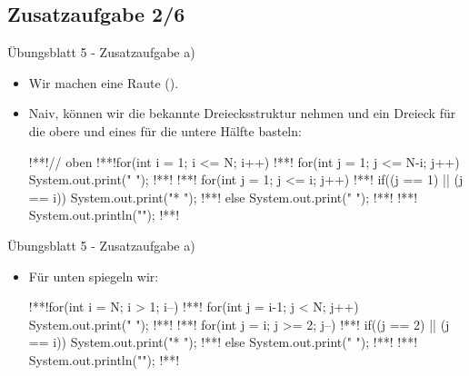 \subsection{Zusatzaufgabe 2/6}
\begin{frame}[fragile]{Übungsblatt 5 - Zusatzaufgabe a)}
    \begin{itemize}[<+(1)->]
        \item Wir machen eine Raute ().
        \item Naiv, können wir die bekannte Dreiecksstruktur nehmen und ein Dreieck für die obere und eines für die untere Hälfte basteln:
\begin{plainjava}
!**!// oben
!**!for(int i = 1; i <= N; i++) {
!**!    for(int j = 1; j <= N-i; j++) System.out.print(" ");
!**!
!**!    for(int j = 1; j <= i; j++) {
!**!        if((j == 1) || (j == i)) System.out.print("* ");
!**!        else System.out.print("  ");
!**!    }
!**!    System.out.println("");
!**!}
\end{plainjava}
    \end{itemize}
\end{frame}

\begin{frame}[fragile]{Übungsblatt 5 - Zusatzaufgabe a)}
    \begin{itemize}[<+(1)->]
        \item Für unten spiegeln wir:
\begin{plainjava}
!**!for(int i = N; i > 1; i--) {
!**!    for(int j = i-1; j < N; j++) System.out.print(" ");
!**!
!**!    for(int j = i; j >= 2; j--) {
!**!        if((j == 2) || (j == i)) System.out.print("* ");
!**!        else System.out.print("  ");
!**!    }
!**!    System.out.println("");
!**!}
\end{plainjava}
    \end{itemize}
\end{frame}

